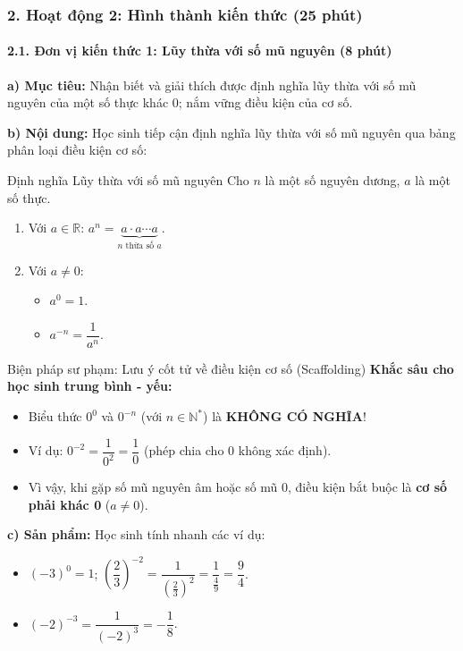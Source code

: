 \documentclass[12pt, a4paper]{article}
\begin{document}
\subsubsection*{2. Hoạt động 2: Hình thành kiến thức (25 phút)}

\paragraph{2.1. Đơn vị kiến thức 1: Lũy thừa với số mũ nguyên (8 phút)}

\noindent \textbf{a) Mục tiêu:}
Nhận biết và giải thích được định nghĩa lũy thừa với số mũ nguyên của một số thực khác $0$; nắm vững điều kiện của cơ số.

\noindent \textbf{b) Nội dung:}
Học sinh tiếp cận định nghĩa lũy thừa với số mũ nguyên qua bảng phân loại điều kiện cơ số:
\begin{pedabox}{Định nghĩa Lũy thừa với số mũ nguyên}
Cho $n$ là một số nguyên dương, $a$ là một số thực.
\begin{enumerate}[leftmargin=0.6cm]
    \item Với $a \in \mathbb{R}$: $a^n = \underbrace{a \cdot a \cdots a}_{n \text{ thừa số } a}$.
    \item Với $a \neq 0$:
    \begin{itemize}
        \item $a^0 = 1$.
        \item $a^{-n} = \dfrac{1}{a^n}$.
    \end{itemize}
\end{enumerate}
\end{pedabox}

\begin{scaffoldbox}{Biện pháp sư phạm: Lưu ý cốt tử về điều kiện cơ số (Scaffolding)}
\textbf{Khắc sâu cho học sinh trung bình - yếu:}
\begin{itemize}
    \item Biểu thức $0^0$ và $0^{-n}$ (với $n \in \mathbb{N}^*$) là \textbf{KHÔNG CÓ NGHĨA}!
    \item Ví dụ: $0^{-2} = \dfrac{1}{0^2} = \dfrac{1}{0}$ (phép chia cho $0$ không xác định).
    \item Vì vậy, khi gặp số mũ nguyên âm hoặc số mũ $0$, điều kiện bắt buộc là \textbf{cơ số phải khác 0} ($a \neq 0$).
\end{itemize}
\end{scaffoldbox}

\noindent \textbf{c) Sản phẩm:}
Học sinh tính nhanh các ví dụ:
\begin{itemize}
    \item $(-3)^0 = 1$; $\left(\dfrac{2}{3}\right)^{-2} = \dfrac{1}{\left(\frac{2}{3}\right)^2} = \dfrac{1}{\frac{4}{9}} = \dfrac{9}{4}$.
    \item $(-2)^{-3} = \dfrac{1}{(-2)^3} = -\dfrac{1}{8}$.
\end{itemize}
\end{document}

